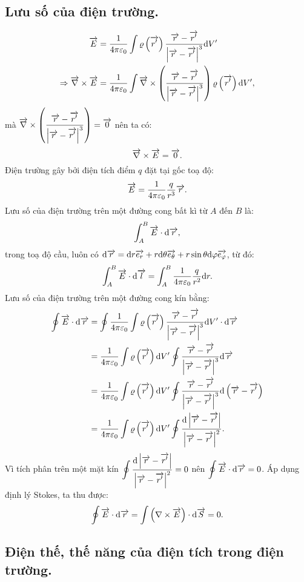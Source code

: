 \begin{appendices}
\subsection{Lưu số của điện trường.}
    \begin{align*}
        \overrightarrow{E}&=\dfrac{1}{4\pi \varepsilon_0}\int\varrho\left(\overrightarrow{r'}\right)\dfrac{\overrightarrow{r}-\overrightarrow{r'}}{\left|\overrightarrow{r}-\overrightarrow{r'}\right|^3}\mathrm{d} V'\\
        \Rightarrow \overrightarrow{\nabla}\times\overrightarrow{E}&=\dfrac{1}{4\pi \varepsilon_0}\int\overrightarrow{\nabla}\times\left(\dfrac{\overrightarrow{r}-\overrightarrow{r'}}{\left|\overrightarrow{r}-\overrightarrow{r'}\right|^3}\right)\varrho\left(\overrightarrow{r'}\right)\mathrm{d} V',
    \end{align*}
    mà $\overrightarrow{\nabla}\times\left(\dfrac{\overrightarrow{r}-\overrightarrow{r'}}{\left|\overrightarrow{r}-\overrightarrow{r'}\right|^3}\right)=\overrightarrow{0}$ nên ta có:
    $$\overrightarrow{\nabla}\times\overrightarrow{E}=\overrightarrow{0}.$$
    Điện trường gây bởi điện tích điểm $q$ đặt tại gốc toạ độ:
    $$\overrightarrow{E}=\dfrac{1}{4\pi \varepsilon_0}\dfrac{q}{r^3}\overrightarrow{r}.$$
    Lưu số của điện trường trên một đường cong bất kì từ $A$ đến $B$ là:
    $$\int_{A}^{B}\overrightarrow{E}\cdot \mathrm{d}\overrightarrow{r},$$
    trong toạ độ cầu, luôn có $\mathrm{d}\overrightarrow{r}=\mathrm{d} r\overrightarrow{e_r}+r\mathrm{d}\theta\overrightarrow{e_\theta}+r\sin{\theta}\mathrm{d}\varphi\overrightarrow{e_\varphi}$, từ đó:
    $$\int_{A}^{B}\overrightarrow{E}\cdot \mathrm{d}\overrightarrow{l}=\int_{A}^{B}\dfrac{1}{4\pi \varepsilon_0}\dfrac{q}{r^2}\mathrm{d} r.$$
    Lưu số của điện trường trên một đường cong kín bằng:
    \begin{align*}
    \oint\overrightarrow{E}\cdot \mathrm{d}\overrightarrow{r}&=\oint \dfrac{1}{4\pi \varepsilon_0}\int\varrho\left(\overrightarrow{r'}\right)\dfrac{\overrightarrow{r}-\overrightarrow{r'}}{\left|\overrightarrow{r}-\overrightarrow{r'}\right|^3}\mathrm{d} V'\cdot\mathrm{d} \overrightarrow{r}\\
     &=\dfrac{1}{4\pi \varepsilon_0}\int\varrho\left(\overrightarrow{r'}\right)\mathrm{d} V'\oint \dfrac{\overrightarrow{r}-\overrightarrow{r'}}{\left|\overrightarrow{r}-\overrightarrow{r'}\right|^3}\mathrm{d} \overrightarrow{r}\\
    &=\dfrac{1}{4\pi \varepsilon_0}\int\varrho\left(\overrightarrow{r'}\right)\mathrm{d} V'\oint \dfrac{\overrightarrow{r}-\overrightarrow{r'}}{\left|\overrightarrow{r}-\overrightarrow{r'}\right|^3}\mathrm{d} \left(\overrightarrow{r}-\overrightarrow{r'}\right)\\
    &=\dfrac{1}{4\pi \varepsilon_0}\int\varrho\left(\overrightarrow{r'}\right)\mathrm{d} V'\oint \dfrac{\mathrm{d}\left|\overrightarrow{r}-\overrightarrow{r'}\right|}{\left|\overrightarrow{r}-\overrightarrow{r'}\right|^2}.
    \end{align*}
    Vì tích phân trên một mặt kín $\displaystyle\oint \dfrac{\mathrm{d}\left|\overrightarrow{r}-\overrightarrow{r'}\right|}{\left|\overrightarrow{r}-\overrightarrow{r'}\right|^2}=0$ nên $\displaystyle\oint\overrightarrow{E}\cdot \mathrm{d}\overrightarrow{r}=0$.
    Áp dụng định lý Stokes, ta thu được:
    $$\oint\overrightarrow{E}\cdot \mathrm{d}\overrightarrow{r}=\int\left(\nabla \times \overrightarrow{E}\right)\cdot\mathrm{d} \overrightarrow{S}=0.$$
\subsection{Điện thế, thế năng của điện tích trong điện trường.}

\end{appendices}

